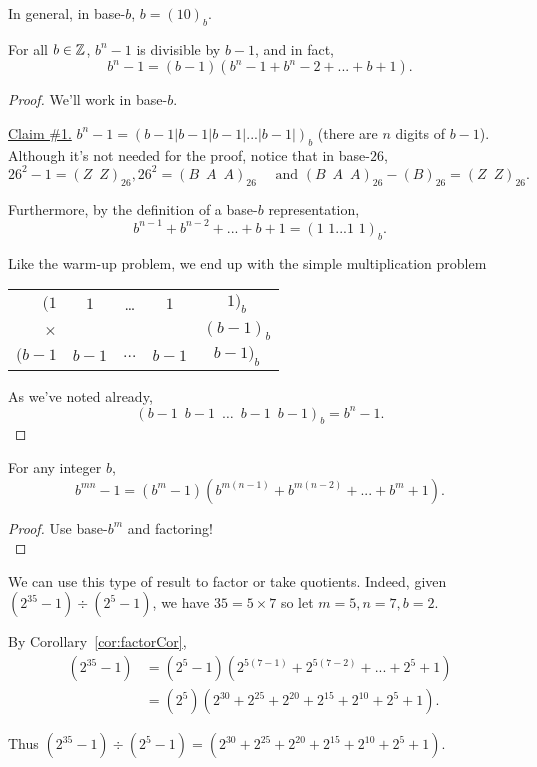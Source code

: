 \begin{proposition} In general, in base-$b$, $b=(10)_b$. \end{proposition}

\begin{proposition} For all $b \in \mathbb{Z}$, $b^n - 1$ is divisible by $b-1$, and in fact, 
$$b^n -1 = (b-1)(b^n-1 + b^n-2 + ... + b + 1).$$
\end{proposition}

\begin{proof} We'll work in base-$b$.

\underline{Claim \#1.} $b^n-1 = (b-1 | b-1 | b-1 |...| b-1 |)_b$ (there are $n$ digits of $b-1$).\\

Although it's not needed for the proof, notice that in base-$26$, 
\[26^2 -1 = (Z\,\,\,Z)_{26}, 26^2=(B\,\,\,A\,\,\,A)_{26} \quad \text{ and } (B\,\,\,A\,\,\,A)_{26} - (B)_{26} = (Z\,\,\,Z)_{26}.\]

Furthermore, by the definition of a base-$b$ representation,
\[b^{n-1} + b^{n-2} + ... + b + 1 = (1\,\,1...1\,\,1)_b.\]

Like the warm-up problem, we end up with the simple multiplication problem

\begin{center}
\begin{tabular}{r c c c c}
$(1$ & $1$ & \ldots & $1$ & $1)_{b}$\\
$\times$ & & & & $(b-1)_{b}$\\
\hline
$(b-1$ & $b-1$ & $\ldots$ & $b-1$ & $b-1)_{b}$
\end{tabular}
\end{center}

As we've noted already, 
\[ (b-1 \,\,\, b-1 \,\,\, \ldots \,\,\, b-1 \,\,\, b-1)_b = b^n -1.\]

\end{proof}

\begin{corollary}\label{cor:factorCor} For any integer $b$, \[b^{mn} - 1 = (b^{m}-1)(b^{m(n-1)} + b^{m(n-2)} +...+b^m + 1).\]
\end{corollary}

\begin{proof}
Use base-$b^m$ and factoring!\\
\end{proof}

\begin{example} We can use this type of result to factor or take quotients.  Indeed, given $(2^{35} - 1 ) \div (2^5 -1)$, we have $35 = 5 \times 7$ so let $m=5, n=7, b=2$.

By Corollary~\ref{cor:factorCor},
\begin{align*}
(2^{35}-1) &= (2^{5}-1)(2^{5(7-1)}+2^{5(7-2)}+...+2^5+1)\\
 &= (2^{5})(2^{30}+2^{25}+2^{20}+2^{15}+2^{10}+2^5+1).
\end{align*}

Thus $(2^{35} - 1 ) \div (2^5 -1) = (2^{30}+2^{25}+2^{20}+2^{15}+2^{10}+2^5+1)$.
\end{example}

